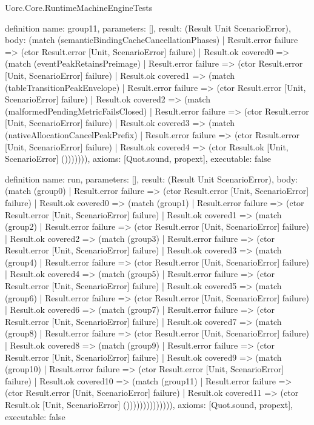 \begin{lexlean}{Uorc.Core.RuntimeMachineEngineTests}
\begin{semanticmodule}
definition{
  name: group11,
  parameters: [],
  result: (Result Unit ScenarioError),
  body: (match (semanticBindingCacheCancellationPhases)
    | Result.error failure => (ctor Result.error [Unit, ScenarioError] failure)
    | Result.ok covered0 => (match (eventPeakRetainsPreimage)
      | Result.error failure => (ctor Result.error [Unit, ScenarioError] failure)
      | Result.ok covered1 => (match (tableTransitionPeakEnvelope)
        | Result.error failure => (ctor Result.error [Unit, ScenarioError] failure)
        | Result.ok covered2 => (match (malformedPendingMetricFailsClosed)
          | Result.error failure => (ctor Result.error [Unit, ScenarioError] failure)
          | Result.ok covered3 => (match (nativeAllocationCancelPeakPrefix)
            | Result.error failure => (ctor Result.error [Unit, ScenarioError] failure)
            | Result.ok covered4 => (ctor Result.ok [Unit, ScenarioError] ())))))),
  axioms: [Quot.sound, propext],
  executable: false
}

definition{
  name: run,
  parameters: [],
  result: (Result Unit ScenarioError),
  body: (match (group0)
    | Result.error failure => (ctor Result.error [Unit, ScenarioError] failure)
    | Result.ok covered0 => (match (group1)
      | Result.error failure => (ctor Result.error [Unit, ScenarioError] failure)
      | Result.ok covered1 => (match (group2)
        | Result.error failure => (ctor Result.error [Unit, ScenarioError] failure)
        | Result.ok covered2 => (match (group3)
          | Result.error failure => (ctor Result.error [Unit, ScenarioError] failure)
          | Result.ok covered3 => (match (group4)
            | Result.error failure => (ctor Result.error [Unit, ScenarioError] failure)
            | Result.ok covered4 => (match (group5)
              | Result.error failure => (ctor Result.error [Unit, ScenarioError] failure)
              | Result.ok covered5 => (match (group6)
                | Result.error failure => (ctor Result.error [Unit, ScenarioError] failure)
                | Result.ok covered6 => (match (group7)
                  | Result.error failure => (ctor Result.error [Unit, ScenarioError] failure)
                  | Result.ok covered7 => (match (group8)
                    | Result.error failure => (ctor Result.error [Unit, ScenarioError] failure)
                    | Result.ok covered8 => (match (group9)
                      | Result.error failure => (ctor Result.error [Unit, ScenarioError] failure)
                      | Result.ok covered9 => (match (group10)
                        | Result.error failure => (ctor Result.error [Unit, ScenarioError] failure)
                        | Result.ok covered10 => (match (group11)
                          | Result.error failure => (ctor Result.error [Unit, ScenarioError] failure)
                          | Result.ok covered11 => (ctor Result.ok [Unit, ScenarioError] ()))))))))))))),
  axioms: [Quot.sound, propext],
  executable: false
}
\end{semanticmodule}
\end{lexlean}
